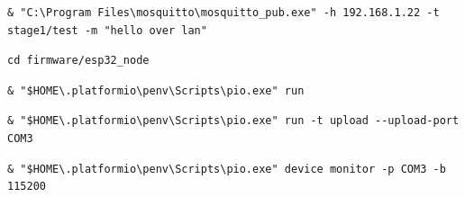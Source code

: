 \documentclass[12pt,a4paper]{article}
\begin{document}
\begin{lstlisting}
& "C:\Program Files\mosquitto\mosquitto_pub.exe" -h 192.168.1.22 -t stage1/test -m "hello over lan"
\end{lstlisting}

\begin{lstlisting}
cd firmware/esp32_node
\end{lstlisting}

\begin{lstlisting}
& "$HOME\.platformio\penv\Scripts\pio.exe" run
\end{lstlisting}

\begin{lstlisting}
& "$HOME\.platformio\penv\Scripts\pio.exe" run -t upload --upload-port COM3
\end{lstlisting}

\begin{lstlisting}
& "$HOME\.platformio\penv\Scripts\pio.exe" device monitor -p COM3 -b 115200
\end{lstlisting}
\end{document}
